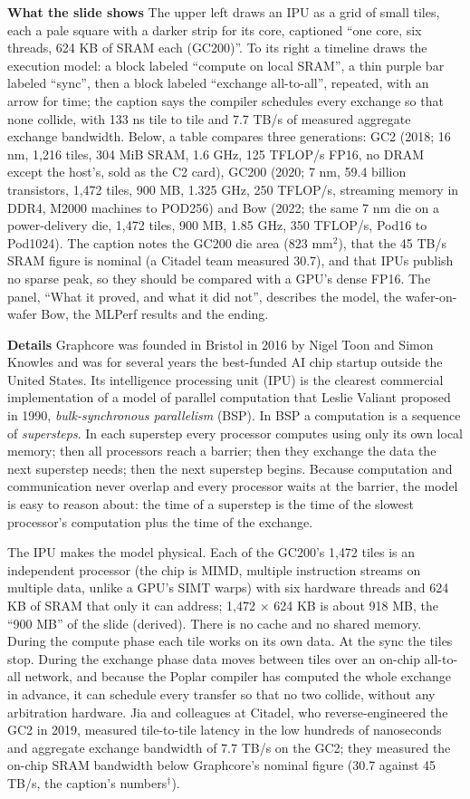 \documentclass[11pt,letterpaper]{article}
\newcommand{\para}[1]{\medskip\noindent\textbf{#1}\quad}
\begin{document}
\para{What the slide shows} The upper left draws an IPU as a grid of small tiles, each a pale square with a darker strip for its core, captioned ``one core, six threads, 624 KB of SRAM each (GC200)''. To its right a timeline draws the execution model: a block labeled ``compute on local SRAM'', a thin purple bar labeled ``sync'', then a block labeled ``exchange all-to-all'', repeated, with an arrow for time; the caption says the compiler schedules every exchange so that none collide, with 133 ns tile to tile and 7.7 TB/s of measured aggregate exchange bandwidth. Below, a table compares three generations: GC2 (2018; 16 nm, 1{,}216 tiles, 304 MiB SRAM, 1.6 GHz, 125 TFLOP/s FP16, no DRAM except the host's, sold as the C2 card), GC200 (2020; 7 nm, 59.4 billion transistors, 1{,}472 tiles, 900 MB, 1.325 GHz, 250 TFLOP/s, streaming memory in DDR4, M2000 machines to POD256) and Bow (2022; the same 7 nm die on a power-delivery die, 1{,}472 tiles, 900 MB, 1.85 GHz, 350 TFLOP/s, Pod16 to Pod1024). The caption notes the GC200 die area (823 mm$^2$), that the 45 TB/s SRAM figure is nominal (a Citadel team measured 30.7), and that IPUs publish no sparse peak, so they should be compared with a GPU's dense FP16. The panel, ``What it proved, and what it did not'', describes the model, the wafer-on-wafer Bow, the MLPerf results and the ending.

\para{Details} Graphcore was founded in Bristol in 2016 by Nigel Toon and Simon Knowles and was for several years the best-funded AI chip startup outside the United States. Its intelligence processing unit (IPU) is the clearest commercial implementation of a model of parallel computation that Leslie Valiant proposed in 1990, \emph{bulk-synchronous parallelism} (BSP). In BSP a computation is a sequence of \emph{supersteps}. In each superstep every processor computes using only its own local memory; then all processors reach a barrier; then they exchange the data the next superstep needs; then the next superstep begins. Because computation and communication never overlap and every processor waits at the barrier, the model is easy to reason about: the time of a superstep is the time of the slowest processor's computation plus the time of the exchange.

The IPU makes the model physical. Each of the GC200's 1{,}472 tiles is an independent processor (the chip is MIMD, multiple instruction streams on multiple data, unlike a GPU's SIMT warps) with six hardware threads and 624 KB of SRAM that only it can address; 1{,}472 $\times$ 624 KB is about 918 MB, the ``900 MB'' of the slide (derived). There is no cache and no shared memory. During the compute phase each tile works on its own data. At the sync the tiles stop. During the exchange phase data moves between tiles over an on-chip all-to-all network, and because the Poplar compiler has computed the whole exchange in advance, it can schedule every transfer so that no two collide, without any arbitration hardware. Jia and colleagues at Citadel, who reverse-engineered the GC2 in 2019, measured tile-to-tile latency in the low hundreds of nanoseconds and aggregate exchange bandwidth of 7.7 TB/s on the GC2; they measured the on-chip SRAM bandwidth below Graphcore's nominal figure (30.7 against 45 TB/s, the caption's numbers$^\dagger$).
\end{document}

